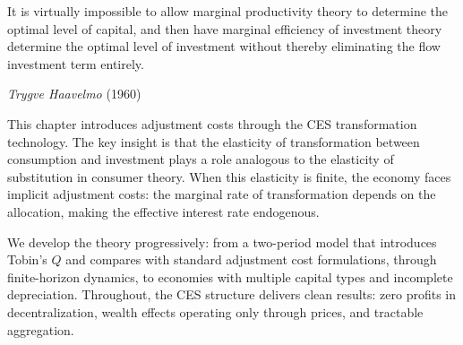 \epigraph{It is virtually impossible to allow marginal productivity theory to determine the optimal level of capital, and then have marginal efficiency of investment theory determine the optimal level of investment without thereby eliminating the flow investment term entirely.}{\textit{Trygve Haavelmo} (1960)}

This chapter introduces adjustment costs through the CES transformation technology. The key insight is that the elasticity of transformation between consumption and investment plays a role analogous to the elasticity of substitution in consumer theory. When this elasticity is finite, the economy faces implicit adjustment costs: the marginal rate of transformation depends on the allocation, making the effective interest rate endogenous.

We develop the theory progressively: from a two-period model that introduces Tobin's $Q$ and compares with standard adjustment cost formulations, through finite-horizon dynamics, to economies with multiple capital types and incomplete depreciation. Throughout, the CES structure delivers clean results: zero profits in decentralization, wealth effects operating only through prices, and tractable aggregation.









